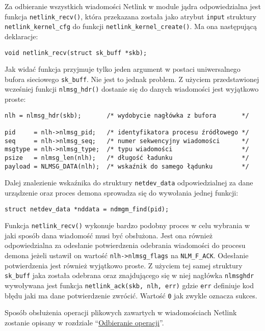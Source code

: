 \documentclass[10pt]{article}
\begin{document}
Za odbieranie wszystkich wiadomości Netlink w module jądra odpowiedzialna jest funkcja \texttt{netlink\_recv()}, która przekazana została jako atrybut \texttt{input} struktury \texttt{netlink\_kernel\_cfg} do funkcji \texttt{netlink\_kernel\_create()}. Ma ona następującą deklaracje:

\begin{verbatim}
void netlink_recv(struct sk_buff *skb);
\end{verbatim}

Jak widać funkcja przyjmuje tylko jeden argument w postaci uniwersalnego bufora sieciowego \texttt{sk\_buff}. Nie jest to jednak problem. Z użyciem przedstawionej wcześniej funkcji \texttt{nlmsg\_hdr()} dostanie się do danych wiadomości jest wyjątkowo proste:

\begin{verbatim}
nlh = nlmsg_hdr(skb);       /* wydobycie nagłówka z bufora       */

pid     = nlh->nlmsg_pid;   /* identyfikatora procesu źródłowego */
seq     = nlh->nlmsg_seq;   /* numer sekwencyjny wiadomości      */
msgtype = nlh->nlmsg_type;  /* typu wiadomości                   */
psize   = nlmsg_len(nlh);   /* długość ładunku                   */
payload = NLMSG_DATA(nlh);  /* wskaźnik do samego łądunku        */
\end{verbatim}

Dalej znalezienie wskaźnika do struktury \texttt{netdev\_data} odpowiedzialnej za dane urządzenie oraz proces demona sprowadza się do wywołania jednej funkcji:

\begin{verbatim}
struct netdev_data *nddata = ndmgm_find(pid);
\end{verbatim}

Funkcja \texttt{netlink\_recv()} wykonuje bardzo podobny proces w celu wybrania w jaki sposób dana wiadomość musi być obsłużona. Jest ona również odpowiedzialna za odesłanie potwierdzenia odebrania wiadomości do procesu demona jeżeli ustawił on wartość \texttt{nlh-\textgreater{}nlmsg\_flags} na \texttt{NLM\_F\_ACK}.  Odesłanie potwierdzenia jest również wyjątkowo proste. Z użyciem tej samej struktury \texttt{sk\_buff} jaka została odebrana oraz znajdującego się w niej nagłówka \texttt{nlmsghdr} wywoływana jest funkcja \texttt{netlink\_ack(skb, nlh, err)} gdzie \texttt{err} definiuje kod błędu jaki ma dane potwierdzenie zwrócić. Wartość \texttt{0} jak zwykle oznacza sukces.

Sposób obsłużenia operacji plikowych zawartych w wiadomościach Netlink zostanie opisany w rozdziale ``\hyperref[odbieranie-operacji]{Odbieranie operacji}''.
\end{document}
